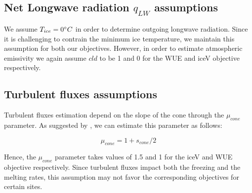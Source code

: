 \documentclass[tc, manuscript]{copernicus}
\begin{document}
\subsection{Net Longwave radiation \texorpdfstring{$q_{LW}$}{Lg} assumptions} \label{sec:LW}

We assume $T_{ice} = 0 ^{\circ} C$ in order to determine outgoing longwave radiation. Since it is challenging to
contrain the minimum ice temperature, we maintain this assumption for both our objectives. However, in order to
estimate atmospheric emissivity we again assume $cld$ to be 1 and 0 for the WUE and iceV objective respectively.

\subsection{Turbulent fluxes assumptions} \label{sec:Qs}

Turbulent fluxes estimation depend on the slope of the cone through the $\mu_{cone}$ parameter. As suggested 
by \citet{oerlemansBriefCommunicationGrowth2021}, we can estimate this parameter as follows:

\begin{equation}
  \mu_{cone} =1 + s_{cone}/2
\end{equation}

Hence, the $\mu_{cone}$ parameter takes values of 1.5 and 1 for the iceV and WUE objective respectively.  Since
turbulent fluxes impact both the freezing and the melting rates, this assumption may not favor the corresponding
objectives for certain sites.

\noappendix 



\end{document}
